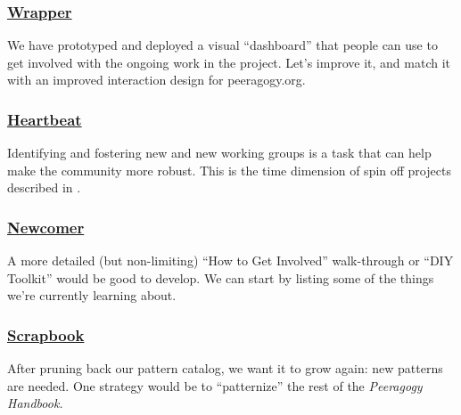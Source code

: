 \subsubsection*{\hyperref[sec:Wrapper]{Wrapper}}
We have prototyped and deployed a visual ``dashboard'' that people can use to get involved with the ongoing work in the project.  Let's improve it, and match it with an improved interaction design for peeragogy.org.

\subsubsection*{\hyperref[sec:Heartbeat]{Heartbeat}} Identifying and fostering new  and new working groups is a task that can help make the community more robust.  This is the time dimension of spin off projects described in .

\subsubsection*{\hyperref[sec:Newcomer]{Newcomer}} A more detailed (but non-limiting) ``How to Get Involved'' walk-through or ``DIY Toolkit'' would be good to develop. We can start by listing some of the things we're currently learning about.

\subsubsection*{\hyperref[sec:Scrapbook]{Scrapbook}} 
After pruning back our pattern catalog, we want it to grow again: new patterns are needed.
One strategy would be to ``patternize'' the rest of the \emph{Peeragogy Handbook.}


